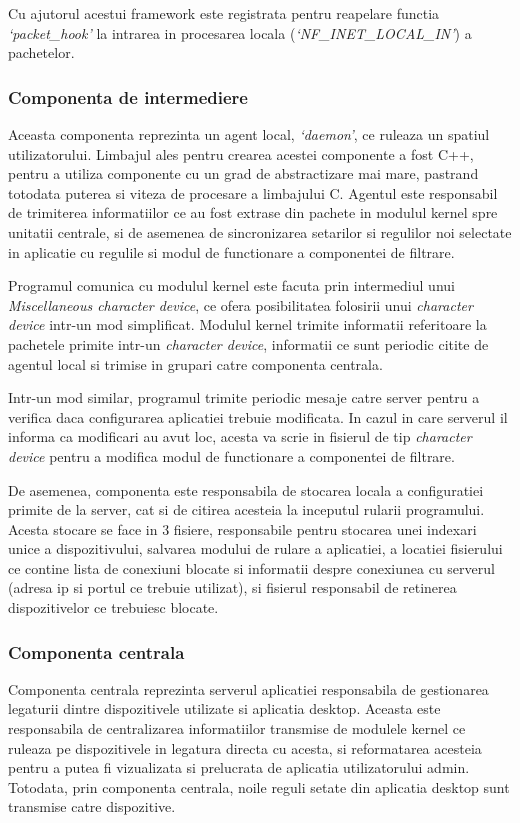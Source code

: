 Cu ajutorul acestui framework este registrata pentru reapelare functia
\textit{`packet\_hook'} la intrarea in procesarea locala
(\textit{`NF\_INET\_LOCAL\_IN'}) a pachetelor.

\subsubsection{Componenta de intermediere}
Aceasta componenta reprezinta un agent local, \textit{`daemon'}, ce ruleaza un
spatiul utilizatorului. Limbajul ales pentru crearea acestei componente a fost
C++, pentru a utiliza componente cu un grad de abstractizare mai mare, pastrand
totodata puterea si viteza de procesare a limbajului C. Agentul este responsabil
de trimiterea informatiilor ce au fost extrase din pachete in modulul kernel
spre unitatii centrale, si de asemenea de sincronizarea setarilor si regulilor
noi selectate in aplicatie cu regulile si modul de functionare a componentei de
filtrare.

Programul comunica cu modulul kernel este facuta prin intermediul unui
\textit{Miscellaneous character device}, ce ofera posibilitatea folosirii unui
\textit{character device} intr-un mod simplificat. Modulul kernel trimite
informatii referitoare la pachetele primite intr-un \textit{character device},
informatii ce sunt periodic citite de agentul local si trimise in grupari catre
componenta centrala.

Intr-un mod similar, programul trimite periodic mesaje catre server pentru a
verifica daca configurarea aplicatiei trebuie modificata. In cazul in care
serverul il informa ca modificari au avut loc, acesta va scrie in fisierul de
tip \textit{character device} pentru a modifica modul de functionare a
componentei de filtrare.

De asemenea, componenta este responsabila de stocarea locala a configuratiei
primite de la server, cat si de citirea acesteia la inceputul rularii
programului. Acesta stocare se face in 3 fisiere, responsabile pentru stocarea
unei indexari unice a dispozitivului, salvarea modului de rulare a aplicatiei, a
locatiei fisierului ce contine lista de conexiuni blocate si informatii despre
conexiunea cu serverul (adresa ip si portul ce trebuie utilizat), si fisierul
responsabil de retinerea dispozitivelor ce trebuiesc blocate.

\subsubsection{Componenta centrala}
Componenta centrala reprezinta serverul aplicatiei responsabila de gestionarea
legaturii dintre dispozitivele utilizate si aplicatia desktop. Aceasta este
responsabila de centralizarea informatiilor transmise de modulele kernel ce
ruleaza pe dispozitivele in legatura directa cu acesta, si reformatarea acesteia
pentru a putea fi vizualizata si prelucrata de aplicatia utilizatorului admin.
Totodata, prin componenta centrala, noile reguli setate din aplicatia desktop sunt
transmise catre dispozitive.

